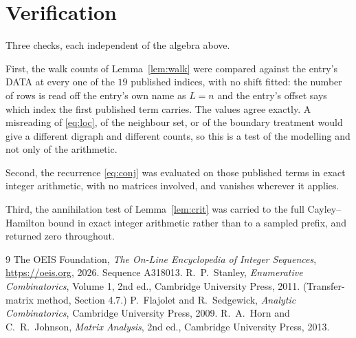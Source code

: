 \documentclass[11pt,a4paper]{article}
\theoremstyle{plain}
\theoremstyle{definition}
\begin{document}
\section{Verification}

Three checks, each independent of the algebra above.

First, the walk counts of Lemma~\ref{lem:walk} were compared against the entry's DATA at
every one of the $19$ published indices, with no shift fitted: the number of rows is
read off the entry's own name as $L=n$ and the entry's offset says which index the first
published term carries. The values agree exactly. A misreading of \eqref{eq:loc}, of the
neighbour set, or of the boundary treatment would give a different digraph and different
counts, so this is a test of the modelling and not only of the arithmetic.

Second, the recurrence \eqref{eq:conj} was evaluated on those published terms in exact
integer arithmetic, with no matrices involved, and vanishes wherever it applies.

Third, the annihilation test of Lemma~\ref{lem:crit} was carried to the full
Cayley--Hamilton bound in exact integer arithmetic rather than to a sampled prefix, and
returned zero throughout.

\begin{thebibliography}{9}
 The OEIS Foundation, \emph{The On-Line Encyclopedia of Integer
Sequences}, \url{https://oeis.org}, 2026. Sequence A318013.
 R.~P.~Stanley, \emph{Enumerative Combinatorics}, Volume 1, 2nd ed.,
Cambridge University Press, 2011. (Transfer-matrix method, Section 4.7.)
 P.~Flajolet and R.~Sedgewick, \emph{Analytic Combinatorics}, Cambridge
University Press, 2009.
 R.~A.~Horn and C.~R.~Johnson, \emph{Matrix Analysis}, 2nd ed., Cambridge
University Press, 2013.
\end{thebibliography}
\end{document}

